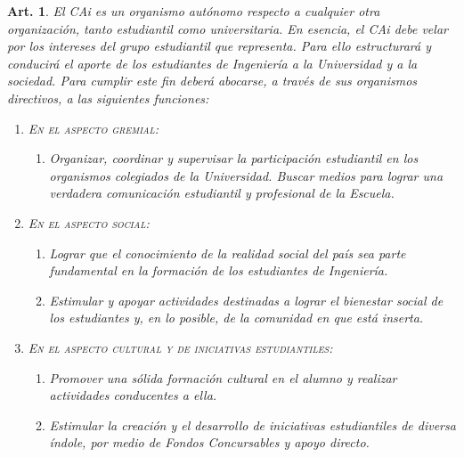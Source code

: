 \documentclass[letterpaper,11pt]{article}
\theoremstyle{plain}
\newtheorem{art}{Art.} %
\begin{document}
		\begin{art}\label{finalidadesCAi}
			El CAi es un organismo autónomo respecto a cualquier otra organización, tanto estudiantil como universitaria. En esencia, el CAi debe velar por los intereses del grupo estudiantil que representa. Para ello estructurará y conducirá el aporte de los estudiantes de Ingeniería a la Universidad y a la sociedad. Para cumplir este fin deberá abocarse, a través de sus organismos directivos, a las siguientes funciones:

			\begin{enumerate}

				\item \label{gremial}\textsc{\sc En el aspecto gremial:}
					\begin{enumerate}
						\item Organizar, coordinar y supervisar la participación estudiantil en los organismos colegiados de la Universidad. Buscar medios para lograr una verdadera comunicación estudiantil y profesional de la Escuela.
					\end{enumerate}

				\item \label{social} \textsc{En el aspecto social:}
					\begin{enumerate}
						\item Lograr que el conocimiento de la realidad social del país sea parte fundamental en la formación de los estudiantes de Ingeniería.

						\item \label{bienestar_social} Estimular y apoyar actividades destinadas a lograr el bienestar social de los estudiantes y, en lo posible, de la comunidad en que está inserta.
					\end{enumerate}

				\item \label{cultural}\textsc{En el aspecto cultural y de iniciativas estudiantiles:}
					\begin{enumerate}
						\item Promover una sólida formación cultural en el alumno y realizar actividades conducentes a ella.

						\item Estimular la creación y el desarrollo de iniciativas estudiantiles de diversa índole, por medio de Fondos Concursables y apoyo directo.
					\end{enumerate}

			\end{enumerate}
		\end{art}
\end{document}
